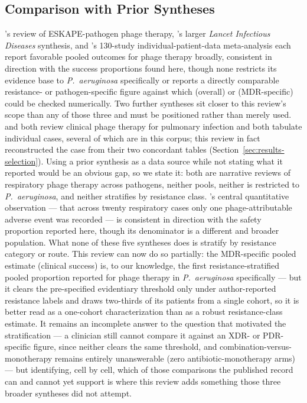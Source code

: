 \subsection{Comparison with Prior Syntheses}
\label{sec:discussion-comparison}

\textcite{ElHaddad2019_eskape}'s review of ESKAPE-pathogen phage therapy, \textcite{Uyttebroek2022_lancetid}'s larger \textit{Lancet Infectious Diseases} synthesis, and \textcite{Liu2025_ijaa}'s 130-study individual-patient-data meta-analysis each report favorable pooled outcomes for phage therapy broadly, consistent in direction with the success proportions found here, though none restricts its evidence base to \textit{P.\ aeruginosa} specifically or reports a directly comparable resistance- or pathogen-specific figure against which \CsOverallEst(overall) or \CsResMDREst(MDR-specific) could be checked numerically. Two further syntheses sit closer to this review's scope than any of those three and must be positioned rather than merely used. \textcite{Mitropoulou2022_errev} and \textcite{Vaezi2024_errev} both review clinical phage therapy for pulmonary infection and both tabulate individual cases, several of which are in this corpus; this review in fact reconstructed the \textcite{Maddocks2019_ajrccm} case from their two concordant tables (Section~\ref{sec:results-selection}). Using a prior synthesis as a data source while not stating what it reported would be an obvious gap, so we state it: both are narrative reviews of respiratory phage therapy across pathogens, neither pools, neither is restricted to \textit{P.\ aeruginosa}, and neither stratifies by resistance class. \citeauthor{Mitropoulou2022_errev}'s central quantitative observation --- that across twenty respiratory cases only one phage-attributable adverse event was recorded --- is consistent in direction with the safety proportion reported here, though its denominator is a different and broader population. What none of these five syntheses does is stratify by resistance category or route. This review can now do so partially: the MDR-specific pooled estimate (\CsResMDREstCI clinical success) is, to our knowledge, the first resistance-stratified pooled proportion reported for phage therapy in \textit{P.\ aeruginosa} specifically --- but it clears the pre-specified evidentiary threshold only under author-reported resistance labels and draws two-thirds of its patients from a single cohort, so it is better read as a one-cohort characterization than as a robust resistance-class estimate. It remains an incomplete answer to the question that motivated the stratification --- a clinician still cannot compare it against an XDR- or PDR-specific figure, since neither clears the same threshold, and combination-versus-monotherapy remains entirely unanswerable (zero antibiotic-monotherapy arms) --- but identifying, cell by cell, which of those comparisons the published record can and cannot yet support is where this review adds something those three broader syntheses did not attempt.

